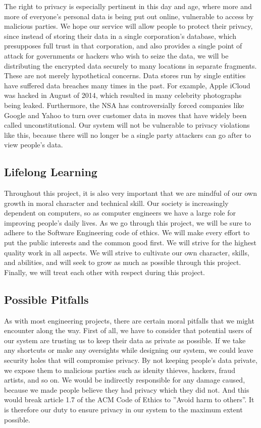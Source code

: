 	The right to privacy is especially pertinent in this day and age, where more and more of everyone’s personal data is being put out online, vulnerable to access by malicious parties.  We hope our service will allow people to protect their privacy, since instead of storing their data in a single corporation’s database, which presupposes full trust in that corporation, and also provides a single point of attack for governments or hackers who wish to seize the data, we will be distributing the encrypted data securely to many locations in separate fragments.  These are not merely hypothetical concerns.  Data stores run by single entities have suffered data breaches many times in the past.  For example, Apple iCloud was hacked in August of 2014, which resulted in many celebrity photographs being leaked. \cite{independent}  Furthermore, the NSA has controversially forced companies like Google and Yahoo to turn over customer data in moves that have widely been called unconstitutional. \cite{gizmodo}  Our system will not be vulnerable to privacy violations like this, because there will no longer be a single party attackers can go after to view people's data.

\subsection{Lifelong Learning}

	Throughout this project, it is also very important that we are mindful of our own growth in moral character and technical skill.  Our society is increasingly dependent on computers, so as computer engineers we have a large role for improving people’s daily lives.  As we go through this project, we will be sure to adhere to the Software Engineering code of ethics.  We will make every effort to put the public interests and the common good first.  We will strive for the highest quality work in all aspects.  We will strive to cultivate our own character, skills, and abilities, and will seek to grow as much as possible through this project.  Finally, we will treat each other with respect during this project.

\subsection{Possible Pitfalls}
	As with most engineering projects, there are certain moral pitfalls that we might encounter along the way.  First of all, we have to consider that potential users of our system are trusting us to keep their data as private as possible.  If we take any shortcuts or make any oversights while designing our system, we could leave security holes that will compromise privacy.  By not keeping people's data private, we expose them to malicious parties such as idenity thieves, hackers, fraud artists, and so on.  We would be indirectly responsible for any damage caused, because we made people believe they had privacy which they did not.  And this would break article 1.7 of the ACM Code of Ethics to ''Avoid harm to others''. \cite{acmethics}  It is therefore our duty to ensure privacy in our system to the maximum extent possible.

